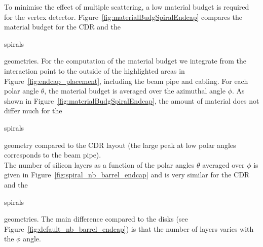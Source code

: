 To minimise the effect of multiple scattering, a low material budget is required for the vertex detector. Figure~\ref{fig:materialBudgSpiralEndcap} compares the material budget for the CDR and the \begin{it}spirals\end{it} geometries. For the computation of the material budget we integrate from the interaction point to the outside of the highlighted areas in Figure~\ref{fig:endcap_placement}, including the beam pipe and cabling. For each polar angle $\theta$, the material budget is averaged over the azimuthal angle $\phi$. As shown in Figure~\ref{fig:materialBudgSpiralEndcap}, the amount of material does not differ much for the \begin{it}spirals\end{it} geometry compared to the CDR layout (the large peak at low polar angles corresponds to the beam pipe).  \\
The number of silicon layers as a function of the polar angles $\theta$ averaged over $\phi$ is given in Figure~\ref{fig:spiral_nb_barrel_endcap} and is very similar for the CDR and the \begin{it}spirals\end{it} geometries. The main difference compared to the disks (see Figure~\ref{fig:default_nb_barrel_endcap}) is that the number of layers varies with the $\phi$ angle.



